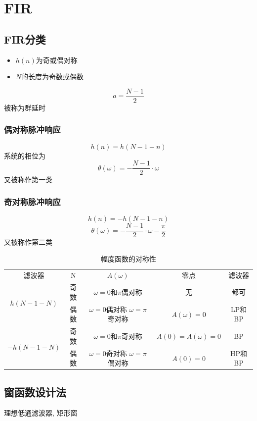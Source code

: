 \documentclass[a4paper]{report}
\begin{document}
\chapter{FIR}
\section{FIR分类}
\begin{itemize}
  \item $h(n)$为奇或偶对称
  \item $N$的长度为奇数或偶数
\end{itemize}
\begin{equation}
  a=\frac{N-1}{2}
\end{equation}
被称为群延时
\subsection{偶对称脉冲响应}
\begin{equation}
  h(n)=h(N-1-n)
\end{equation}
系统的相位为
\begin{equation}
  \theta (\omega)=-\frac{N-1}{2}\cdot \omega
\end{equation}
又被称作第一类
\subsection{奇对称脉冲响应}
\begin{equation}
  h(n)=-h(N-1-n)
\end{equation}
\begin{equation}
  \theta (\omega)=-\frac{N-1}{2}\cdot \omega-\frac{\pi}{2}
\end{equation}
又被称作第二类
\begin{table}[H]
  \centering
  \caption{幅度函数的对称性}
    \begin{tabular}{c|cccc}
    滤波器 & N     & $A(\omega)$  & 零点    & 滤波器 \\
    \multirow{2}[0]{*}{$h(N-1-N)$} &     奇数  &  $\omega=0$和$\pi$偶对称     &  无     &  都可\\
          &   偶数    &  $\omega=0$偶对称 $\omega=\pi$ 奇对称     &  $A(\omega)=0$     &  LP和BP\\
    \multirow{2}[0]{*}{$-h(N-1-N)$} &   奇数    &   $\omega=0$和$\pi$奇对称    &    $A(0)=A(\omega)=0$   & BP \\
          &  偶数     &   $\omega=0$奇对称 $\omega=\pi$ 偶对称    &   $A(0)=0$    & HP和BP \\
    \end{tabular}%
  \label{tab:addlabel}%
\end{table}%

\section{窗函数设计法}
理想低通滤波器, 矩形窗
\end{document}

